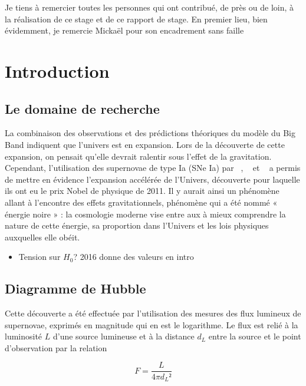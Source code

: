 \documentclass[a4paper, 12pt, svgnames]{article}
\begin{document}

Je tiens à remercier toutes les personnes qui ont contribué, de près ou de loin,
à la réalisation de ce stage et de ce rapport de stage. En premier lieu, bien
évidemment, je remercie Mickaël  pour son encadrement sans faille

\tableofcontents
\newpage

\section{Introduction}\label{sec:int}
\subsection{Le domaine de recherche}\label{ssec:dom}
La combinaison des observations et des prédictions théoriques du modèle du Big
Band indiquent que l'univers est en expansion. Lors de la découverte de cette
expansion, on pensait qu'elle devrait ralentir sous l'effet de la gravitation.
Cependant, l'utilisation des supernovae de type Ia (SNe Ia) par ~\cite{perlmutter_measurements_1999}, 
~\cite{riess_observational_1998} et 
~\cite{schmidt_high-z_1998} a permis de mettre en évidence l'expansion
accélérée de l'Univers, découverte pour laquelle ils ont eu le prix Nobel de
physique de 2011. Il y aurait ainsi un phénomène allant à l'encontre des
effets gravitationnels, phénomène qui a été nommé « énergie noire » : la
cosmologie moderne vise entre aux à mieux comprendre la nature de cette énergie,
sa proportion dans l'Univers et les lois physiques auxquelles elle obéit.

\begin{itemize}
    \item Tension sur $H_0$?  2016 donne des valeurs en intro
\end{itemize}

\subsection{Diagramme de Hubble}\label{ssec:hub}
Cette découverte a été effectuée par l'utilisation des mesures des flux lumineux
de supernovae, exprimés en magnitude qui en est le logarithme. Le flux est relié
à la luminosité $L$ d'une source lumineuse et à la distance $d_L$ entre la source
et le point d'observation par la relation

\begin{equation}
    F = \frac{L}{4\pi d_L²}
\end{equation}
\end{document}
